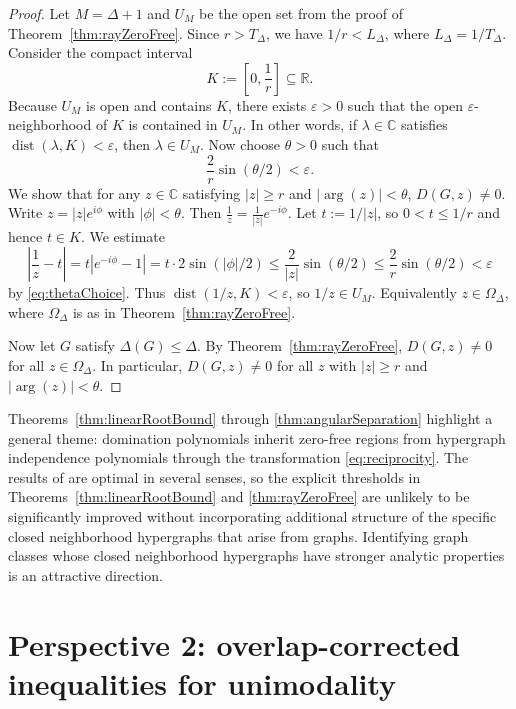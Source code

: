 \documentclass[11pt]{amsart}
\numberwithin{equation}{section}
\DeclareMathOperator{\dist}{dist}
\DeclareMathOperator{\argu}{arg}
\newcommand{\bbC}{\mathbb{C}}
\newcommand{\bbR}{\mathbb{R}}
\begin{document}
\begin{proof}
Let $M=\Delta+1$ and $U_M$ be the open set from the proof of Theorem~\ref{thm:rayZeroFree}. Since $r>T_{\Delta}$, we have $1/r<L_{\Delta}$, where $L_{\Delta}=1/T_{\Delta}$. Consider the compact interval
\[
K:=\left[0,\frac{1}{r}\right]\subseteq \bbR.
\]
Because $U_M$ is open and contains $K$, there exists $\varepsilon>0$ such that the open $\varepsilon$-neighborhood of $K$ is contained in $U_M$. In other words, if $\lambda\in\bbC$ satisfies $\dist(\lambda,K)<\varepsilon$, then $\lambda\in U_M$. Now choose $\theta>0$ such that
\begin{equation}\label{eq:thetaChoice}
\frac{2}{r}\sin(\theta/2)<\varepsilon.
\end{equation}
We show that for any $z\in\bbC$ satisfying $|z|\ge r$ and $|\argu(z)|<\theta$, $D(G,z) \neq 0$. Write $z=|z|e^{i\phi}$ with $|\phi|<\theta$. Then $\frac{1}{z}=\frac{1}{|z|}e^{-i\phi}.$ Let $t:=1/|z|$, so $0<t\le 1/r$ and hence $t\in K$. We estimate
\[
\left|\frac{1}{z}-t\right|
=t\left|e^{-i\phi}-1\right|
=t\cdot 2\sin(|\phi|/2)
\le \frac{2}{|z|}\sin(\theta/2)
\le \frac{2}{r}\sin(\theta/2)
<\varepsilon
\]
by \eqref{eq:thetaChoice}. Thus $\dist(1/z,K)<\varepsilon$, so $1/z\in U_M$. Equivalently $z\in\Omega_{\Delta}$, where $\Omega_{\Delta}$ is as in Theorem~\ref{thm:rayZeroFree}.

Now let $G$ satisfy $\Delta(G)\le \Delta$. By Theorem~\ref{thm:rayZeroFree}, $D(G,z)\neq 0$ for all $z\in\Omega_{\Delta}$. In particular, $D(G,z)\neq 0$ for all $z$ with $|z|\ge r$ and $|\argu(z)|<\theta$.
\end{proof}


Theorems~\ref{thm:linearRootBound} through \ref{thm:angularSeparation} highlight a general theme: domination polynomials inherit zero-free regions from hypergraph independence polynomials through the transformation \eqref{eq:reciprocity}. The results of \cite{BencsBuys2025} are optimal in several senses, so the explicit thresholds in Theorems~\ref{thm:linearRootBound} and \ref{thm:rayZeroFree} are unlikely to be significantly improved without incorporating additional structure of the specific closed neighborhood hypergraphs that arise from graphs. Identifying graph classes whose closed neighborhood hypergraphs have stronger analytic properties is an attractive direction.


\section{Perspective 2: overlap-corrected inequalities for unimodality}
\end{document}
